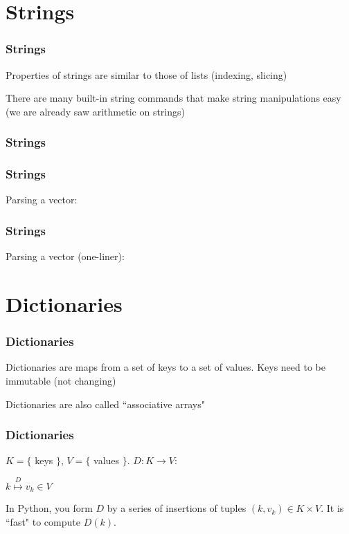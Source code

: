 \documentclass{beamer}
\begin{document}
\section{Strings}

\begin{frame}
\frametitle{Strings}
Properties of strings are similar to those of lists (indexing, slicing)

\vspace{0.1in}

There are many built-in string commands that make string manipulations easy (we are already saw arithmetic on strings)

\end{frame}


\begin{frame}
\frametitle{Strings}


\end{frame}

\begin{frame}
\frametitle{Strings}
Parsing a vector:

\end{frame}

\begin{frame}
\frametitle{Strings}
Parsing a vector (one-liner):

\end{frame}


\section{Dictionaries}

\begin{frame}
\frametitle{Dictionaries}

Dictionaries are maps from a set of keys to a set of values.  Keys need to be immutable (not changing)

\vspace{0.2in}

Dictionaries are also called ``associative arrays"
\end{frame}


\begin{frame}
\frametitle{Dictionaries}

$K = \{$ keys $\}$, $V = \{$ values $\}$.  $D: K \rightarrow V$:

\huge{
\begin{center}
$k \stackrel{D}{\longmapsto} v_k \in V$
\end{center}
} \normalsize{}

\vspace{0.2in}

In Python, you form $D$ by a series of insertions of tuples $(k, v_k) \in K \times V$.  It is ``fast" to compute $D(k)$.

\end{frame}
\end{document}
